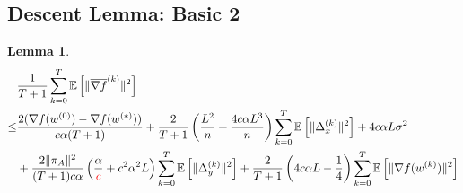 \documentclass{article}
\newtheorem{lemma}[thm]{Lemma}
\newcommand{\EE}[1]{\mathbb{E}\left[#1\right]}
\newcommand{\norm}[1]{\| #1 \|}
\begin{document}
\subsection{Descent Lemma: Basic 2}
\begin{lemma}
  \begin{align*}
    &\frac{1}{T+1}\sum_{k=0}^T\EE{\norm{\overline{\nabla f}^{(k)}}^2}\\ \leq& \frac{2(\nabla f(w^{(0)})-\nabla f(w^{(*)}))}{c\alpha(T+1)}+\frac{2}{T+1}\left(\frac{L^2}{n}+\frac{4c\alpha L^3}{n}\right)\sum_{k=0}^T\EE{\norm{\Delta_x^{(k)}}^2}+4c\alpha L\sigma^2\\&+\frac{2\norm{\pi_A}^2}{(T+1)c\alpha}\left(\frac{\alpha}{\textcolor{red}{c}}+c^2\alpha^2L\right)\sum_{k=0}^T\EE{\norm{\Delta_{y}^{(k)}}^2}+\frac{2}{T+1}\left(4c\alpha L-\frac{1}{4}\right)\sum_{k=0}^T\EE{\norm{\nabla f(w^{(k)})}^2}
  \end{align*}
\end{lemma}
\end{document}
